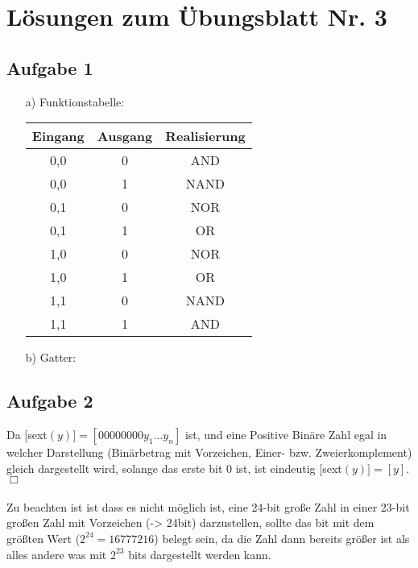 \documentclass{scrartcl}
\begin{document}
	\section*{Lösungen zum Übungsblatt Nr. 3}

	\subsection*{Aufgabe 1}
	\begin{itemize}
	\item[a)] Funktionstabelle:

		\begin{table}[h]

			\begin{tabular}{c|c|c}
				Eingang & Ausgang & Realisierung \\
				\hline
				0,0 & 0 & AND \\
				0,0 & 1 & NAND \\
				0,1 & 0 & NOR \\
				0,1 & 1 & OR \\
				1,0 & 0 & NOR \\
				1,0 & 1 & OR \\
				1,1 & 0 & NAND \\
				1,1 & 1 & AND \\


			\end{tabular}
		\end{table}

	\item[b)] Gatter:



	\end{itemize}
	\subsection*{Aufgabe 2}
	Da [sext\((y)] = [00000000y_1...y_n] \) ist, und eine Positive Binäre Zahl egal in welcher
	Darstellung (Binärbetrag mit Vorzeichen, Einer- bzw. Zweierkomplement) gleich dargestellt
	wird, solange das erste bit 0 ist, ist eindeutig [sext\((y)] = [y] \). \hfill $\Box$
        \\ \\

        Zu beachten ist ist dass es nicht möglich ist, eine 24-bit große Zahl in einer 23-bit
        großen Zahl mit Vorzeichen (-> 24bit) darzustellen, sollte das bit mit dem größten Wert
        ($2^{24} = 16777216$) belegt sein, da die Zahl dann bereits größer ist als alles andere
        was mit $2^{23}$ bits dargestellt werden kann.
\end{document}
